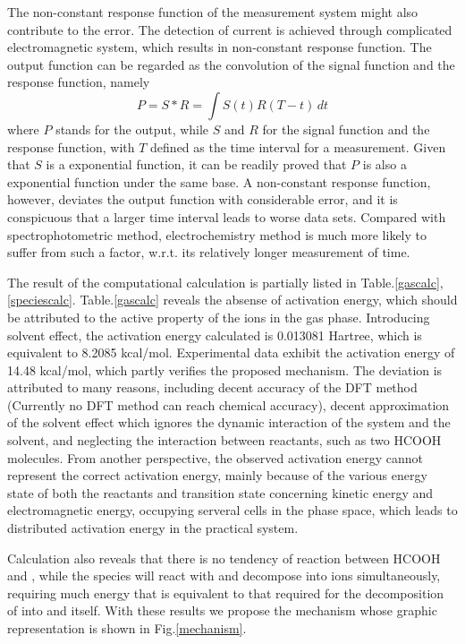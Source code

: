 \documentclass[%
preprint,
 amsmath,amssymb,
 aps,
10.5pt,
]{revtex4-1}
\begin{document}
The non-constant response function of the measurement system might also contribute to the error. The detection of current is achieved through complicated electromagnetic system, which results in non-constant response function. The output function can be regarded as the convolution of the signal function and the response function, namely
\begin{equation}
	P = S * R = \int S(t) R(T-t) \, dt
\end{equation}
where $P$ stands for the output, while $S$ and $R$ for the signal function and the response function, with $T$ defined as the time interval for a measurement. Given that $S$ is a exponential function, it can be readily proved that $P$ is also a exponential function under the same base. A non-constant response function, however, deviates the output function with considerable error, and it is conspicuous that a larger time interval leads to worse data sets. Compared with spectrophotometric method, electrochemistry method is much more likely to suffer from such a factor, w.r.t. its relatively longer measurement of time.

The result of the computational calculation is partially listed in Table.\ref{gascalc},\ref{speciescalc}. Table.\ref{gascalc} reveals the absense of activation energy, which should be attributed to the active property of the ions in the gas phase. Introducing solvent effect, the activation energy calculated is 0.013081 Hartree, which is equivalent to 8.2085 kcal/mol. Experimental data exhibit the activation energy of 
14.48 kcal/mol, which partly verifies the proposed mechanism. The deviation is attributed to many reasons, including decent accuracy of the DFT method (Currently no DFT method can reach chemical accuracy), decent approximation of the solvent effect which ignores the dynamic interaction of the system and the solvent, and neglecting the interaction between reactants, such as two HCOOH molecules. From another perspective, the observed activation energy cannot represent the correct activation energy, mainly because of the various energy state of both the reactants and transition state concerning kinetic energy and electromagnetic energy, occupying serveral cells in the phase space, which leads to distributed activation energy in the practical system.

 Calculation also reveals that there is no tendency of reaction between HCOOH and , while the species  will react with  and decompose into  ions simultaneously, requiring much energy that is equivalent to that required for the decomposition of  into  and  itself. With these results we propose the mechanism whose graphic representation is shown in Fig.\ref{mechanism}.
\end{document}
